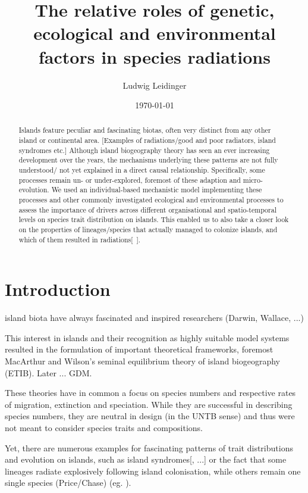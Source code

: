 \documentclass[a4paper]{scrartcl}
\title{The relative roles of genetic, ecological and environmental factors in species radiations}
\author{Ludwig Leidinger}
\date{\today}
\begin{document}
\maketitle

\begin{abstract}
  Islands feature peculiar and fascinating biotas, often very distinct from any other island or continental area.
  [Examples of radiations/good and poor radiators, island syndromes etc.]
  Although island biogeography theory has seen an ever increasing development over the years,
  the mechanisms underlying these patterns are not fully understood/ not yet explained in a direct causal relationship.
  Specifically, some processes remain un- or under-explored, foremost of these adaption and micro-evolution.
  We used an individual-based mechanistic model implementing these processes and other commonly investigated ecological and
  environmental processes to assess the importance of drivers across different organisational and spatio-temporal levels
  on species trait distribution on islands.
  This enabled us to also take a closer look on the properties of lineages/species that actually managed to colonize islands,
  and which of them resulted in radiations[~].
  
  
\end{abstract}

\section{Introduction}
island biota have always fascinated and inspired researchers (Darwin, Wallace, ...)

This interest in islands and their recognition as highly suitable model systems resulted in the formulation of
important theoretical frameworks, foremost MacArthur and Wilson's seminal equilibrium theory of island biogeography (ETIB).
Later ... GDM.

These theories have in common a focus on species numbers and respective rates of migration, extinction and speciation.
While they are successful in describing species numbers, they are neutral in design (in the UNTB sense) and thus were not meant to consider species traits and compositions.

Yet, there are numerous examples for fascinating patterns of trait distributions and evolution on islands, such as island syndromes[, ...] or the fact that some lineages radiate explosively following
island colonisation, while others remain one single species (Price/Chase) (eg. \cite{price2004speciationPrice}).
\end{document}
